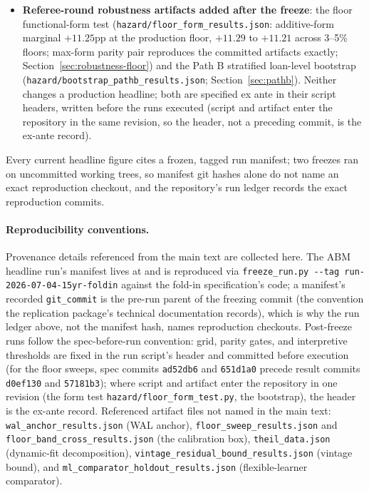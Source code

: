 \documentclass[12pt]{article}
\begin{document}
\begin{itemize}
\item \textbf{Referee-round robustness artifacts added after the freeze}: the floor functional-form test (\texttt{hazard/floor\_form\_results.json}: additive-form marginal $+11.25$pp at the production floor, $+11.29$ to $+11.21$ across 3--5\% floors; max-form parity pair reproduces the committed artifacts exactly; Section~\ref{sec:robustness-floor}) and the Path B stratified loan-level bootstrap (\texttt{hazard/bootstrap\_pathb\_results.json}; Section~\ref{sec:pathb}). Neither changes a production headline; both are specified ex ante in their script headers, written before the runs executed (script and artifact enter the repository in the same revision, so the header, not a preceding commit, is the ex-ante record).
\end{itemize}
\endgroup

Every current headline figure cites a frozen, tagged run manifest; two freezes ran on uncommitted working trees, so manifest git hashes alone do not name an exact reproduction checkout, and the repository's run ledger records the exact reproduction commits.

\paragraph{Reproducibility conventions.} Provenance details referenced from the main text are collected here. The ABM headline run's manifest lives at  and is reproduced via \texttt{freeze\_run.py -{}-tag run-2026-07-04-15yr-foldin} against the fold-in specification's code; a manifest's recorded \texttt{git\_commit} is the pre-run parent of the freezing commit (the convention the replication package's technical documentation records), which is why the run ledger above, not the manifest hash, names reproduction checkouts. Post-freeze runs follow the spec-before-run convention: grid, parity gates, and interpretive thresholds are fixed in the run script's header and committed before execution (for the floor sweeps, spec commits \texttt{ad52db6} and \texttt{651d1a0} precede result commits \texttt{d0ef130} and \texttt{57181b3}); where script and artifact enter the repository in one revision (the form test \texttt{hazard/floor\_form\_test.py}, the bootstrap), the header is the ex-ante record. Referenced artifact files not named in the main text: \texttt{wal\_anchor\_results.json} (WAL anchor), \texttt{floor\_sweep\_results.json} and \texttt{floor\_band\_cross\_results.json} (the calibration box), \texttt{theil\_data.json} (dynamic-fit decomposition), \texttt{vintage\_residual\_bound\_results.json} (vintage bound), and \texttt{ml\_comparator\_holdout\_results.json} (flexible-learner comparator).
\end{document}
